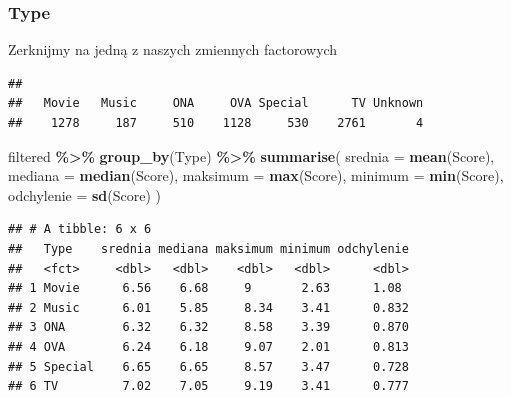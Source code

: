 \documentclass[
]{article}
\newenvironment{Shaded}{\begin{snugshade}}{\end{snugshade}}
\newcommand{\AttributeTok}[1]{\textcolor[rgb]{0.13,0.29,0.53}{#1}}
\newcommand{\FunctionTok}[1]{\textcolor[rgb]{0.13,0.29,0.53}{\textbf{#1}}}
\newcommand{\NormalTok}[1]{#1}
\newcommand{\SpecialCharTok}[1]{\textcolor[rgb]{0.81,0.36,0.00}{\textbf{#1}}}
\begin{document}
\subsubsection{Type}\label{type}

Zerknijmy na jedną z naszych zmiennych factorowych

\begin{Shaded}
\end{Shaded}

\begin{verbatim}
## 
##   Movie   Music     ONA     OVA Special      TV Unknown 
##    1278     187     510    1128     530    2761       4
\end{verbatim}

\begin{Shaded}
\begin{Highlighting}[]
\NormalTok{filtered }\SpecialCharTok{\%\textgreater{}\%}
  \FunctionTok{group\_by}\NormalTok{(Type) }\SpecialCharTok{\%\textgreater{}\%}
  \FunctionTok{summarise}\NormalTok{(}
    \AttributeTok{srednia =} \FunctionTok{mean}\NormalTok{(Score),}
    \AttributeTok{mediana =} \FunctionTok{median}\NormalTok{(Score),}
    \AttributeTok{maksimum =} \FunctionTok{max}\NormalTok{(Score),}
    \AttributeTok{minimum =} \FunctionTok{min}\NormalTok{(Score),}
    \AttributeTok{odchylenie =} \FunctionTok{sd}\NormalTok{(Score)}
\NormalTok{    )}
\end{Highlighting}
\end{Shaded}

\begin{verbatim}
## # A tibble: 6 x 6
##   Type    srednia mediana maksimum minimum odchylenie
##   <fct>     <dbl>   <dbl>    <dbl>   <dbl>      <dbl>
## 1 Movie      6.56    6.68     9       2.63      1.08 
## 2 Music      6.01    5.85     8.34    3.41      0.832
## 3 ONA        6.32    6.32     8.58    3.39      0.870
## 4 OVA        6.24    6.18     9.07    2.01      0.813
## 5 Special    6.65    6.65     8.57    3.47      0.728
## 6 TV         7.02    7.05     9.19    3.41      0.777
\end{verbatim}
\end{document}
